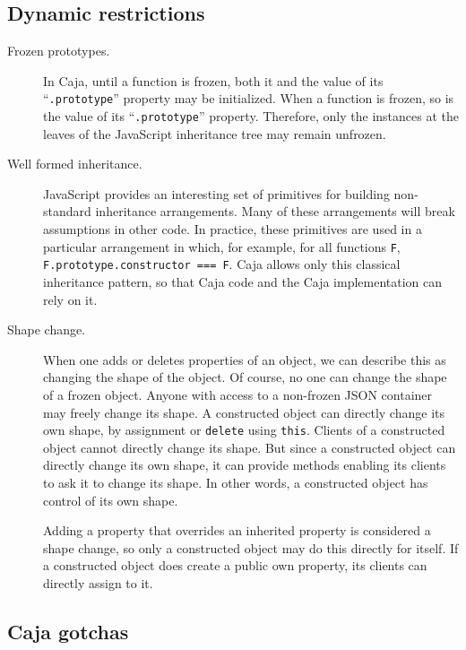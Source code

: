 \documentclass[letterpaper,twocolumn,10pt]{article}
\newcommand{\code}[1]{{\tt {#1}}}              %
\begin{document}
\subsection{Dynamic restrictions}

\begin{description}

  \item[Frozen prototypes.] In Caja, until a function is frozen, both it and 
  the value of its ``\code{.prototype}'' property may be initialized. When a 
  function is frozen, so is the value of its ``\code{.prototype}'' property. 
  Therefore, only the instances at the leaves of the JavaScript inheritance 
  tree may remain unfrozen.
  
   \item[Well formed inheritance.] JavaScript provides an interesting set of 
   primitives for building non-standard inheritance arrangements. Many of 
   these arrangements will break assumptions in other code. In practice, 
   these primitives are used in a particular arrangement in which, for 
   example, for all functions \code{F}, \code{F.prototype.constructor === F}. 
   Caja allows only this classical inheritance pattern, so that Caja code and 
   the Caja implementation can rely on it.
   
   \item[Shape change.] When one adds or deletes properties of an object, we 
   can describe this as changing the shape of the object. Of course, no one 
   can change the shape of a frozen object. Anyone with access to a 
   non-frozen JSON container may freely change its shape. A constructed 
   object can directly change its own shape, by assignment or \code{delete} 
   using \code{this}. Clients of a constructed object cannot directly change 
   its shape. But since a constructed object can directly change its own 
   shape, it can provide methods enabling its clients to ask it to change its 
   shape. In other words, a constructed object has control of its own shape.
   
   Adding a property that overrides an inherited property is considered a 
   shape change, so only a constructed object may do this directly for 
   itself. If a constructed object does create a public own property, its 
   clients can directly assign to it.
   
  
\end{description}

\subsection{Caja gotchas}
\end{document}
